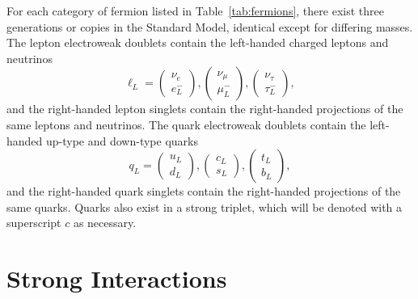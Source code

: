 For each category of fermion listed in Table~\ref{tab:fermions}, there exist three generations or copies in the Standard Model, identical except for differing masses.
The lepton electroweak doublets contain the left-handed charged leptons and neutrinos
\begin{equation}
  \ell_{L} = \begin{pmatrix} \nu_e \\ e^-_L \end{pmatrix} ,
              \begin{pmatrix} \nu_\mu \\ \mu^-_L \end{pmatrix} ,
              \begin{pmatrix} \nu_\tau \\ \tau^-_L \end{pmatrix} ,
\end{equation}
and the right-handed lepton singlets contain the right-handed projections of the same leptons and neutrinos.
The quark electroweak doublets contain the left-handed up-type and down-type quarks
\begin{equation}
  q_{L} = \begin{pmatrix} u_L \\ d_L \end{pmatrix} ,
           \begin{pmatrix} c_L \\ s_L \end{pmatrix} ,
           \begin{pmatrix} t_L \\ b_L \end{pmatrix} ,
\end{equation}
and the right-handed quark singlets contain the right-handed projections of the same quarks.
Quarks also exist in a strong triplet, which will be denoted with a superscript $c$ as necessary.

\section{Strong Interactions}
\label{sec:qcd}

